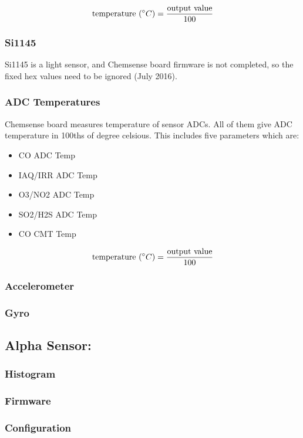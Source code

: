 {\centering 
 \[ \text{temperature }(\degree C) = \frac{\text{output value}}{100} \]
}

\subsubsection{ Si1145}

Si1145 is a light sensor, and Chemsense board firmware is not completed, so the fixed hex values need to be ignored (July 2016).

\subsubsection{ ADC Temperatures}
Chemsense board measures temperature of sensor ADCs. All of them give ADC temperature in 100ths of degree celsious. This includes five parameters which are:
 
\begin{itemize}
  \item CO ADC Temp
  \item IAQ/IRR ADC Temp
  \item O3/NO2 ADC Temp
  \item SO2/H2S ADC Temp
  \item CO CMT Temp
\end{itemize}


{\centering 
 \[ \text{temperature }(\degree C) = \frac{\text{output value}}{100} \]
}

\subsubsection{ Accelerometer}

\subsubsection{ Gyro}

\subsection{Alpha Sensor:}
\subsubsection{ Histogram}

\subsubsection{ Firmware}

\subsubsection{ Configuration}